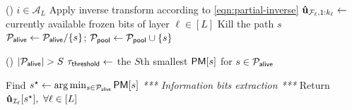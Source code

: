 \documentclass[conference]{IEEEtran}
\begin{document}
\begin{algorithm}
{    \If() {$i \in \mathcal{A}_{L}$}{
         {
            Apply inverse transform according to \eqref{eqn:partial-inverse}\;
            ${\bf \hat u}_{\mathcal{F}_{\ell}, 1:k_{\ell}} \gets $ currently available frozen bits of layer $\ell\in[L]$\;
             {
                Kill the path $s$ \;
                $\mathcal{P}_{\sf alive}\gets \mathcal{P}_{\sf alive} /\{s\}$; $\mathcal{P}_{\sf pool} \gets \mathcal{P}_{\sf pool} \cup \{ s \}$ \;
            }
        }
    }    
    
    \If() {$|\mathcal{P}_{\sf alive}| > S$} {
        $\tau_{\sf threshold} \gets$ the $S$th smallest ${\sf PM}[s]$ for $s\in\mathcal{P}_{\sf alive}$\;
    }
}
Find $s^{\star}\gets \arg \min_{s\in \mathcal{P}_{\sf alive}} {\sf PM}[s]$\;
\vspace{0.2cm}
\emph{*** Information bits extraction ***}\;
Return ${\bf \hat u}_{\mathcal{I}_{\ell}}[s^\star], ~ \forall \ell \in [L]$\;
\end{algorithm}
\end{document}
